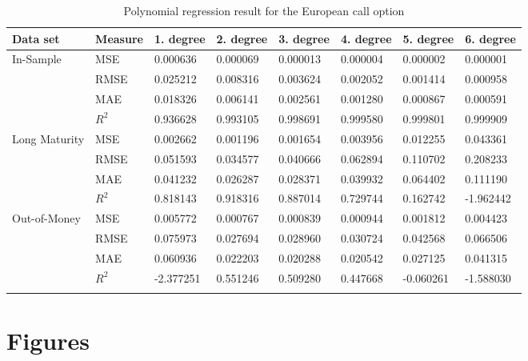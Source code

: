 \begin{table}[th]
\caption{Polynomial regression result for the European call option}
\label{tab:fullEuroCall}
\centering
\begin{tabular}{llllllll}
\toprule
\textbf{Data set} &  \textbf{Measure} & \textbf{1. degree} & \textbf{2. degree} & \textbf{3. degree} & {4. degree} & \textbf{5. degree} & {6. degree}\\
\midrule
In-Sample     &	MSE  & 0.000636 & 0.000069 & 0.000013 & 0.000004 & 0.000002 & 0.000001 \\
		      & RMSE & 0.025212 & 0.008316 & 0.003624 & 0.002052 & 0.001414 & 0.000958 \\
		      & MAE  & 0.018326 & 0.006141 & 0.002561 & 0.001280 & 0.000867 & 0.000591 \\
		      & $R^2$& 0.936628 & 0.993105 & 0.998691 & 0.999580 & 0.999801 & 0.999909 \\
Long Maturity & MSE  & 0.002662 & 0.001196 & 0.001654 & 0.003956 & 0.012255 & 0.043361 \\
		      & RMSE & 0.051593 & 0.034577 & 0.040666 & 0.062894 & 0.110702 & 0.208233 \\
		      & MAE  & 0.041232 & 0.026287 & 0.028371 & 0.039932 & 0.064402 & 0.111190 \\
		      & $R^2$& 0.818143 & 0.918316 & 0.887014 & 0.729744 & 0.162742 & -1.962442 \\
Out-of-Money  & MSE  & 0.005772 & 0.000767 & 0.000839 & 0.000944 & 0.001812 & 0.004423 \\
		      & RMSE & 0.075973 & 0.027694 & 0.028960 & 0.030724 & 0.042568 & 0.066506 \\
		      & MAE  & 0.060936 & 0.022203 & 0.020288 & 0.020542 & 0.027125 & 0.041315\\
		      & $R^2$& -2.377251 & 0.551246 & 0.509280 & 0.447668 & -0.060261 & -1.588030\\
\bottomrule\\
\end{tabular}
\end{table}

\section{Figures}


